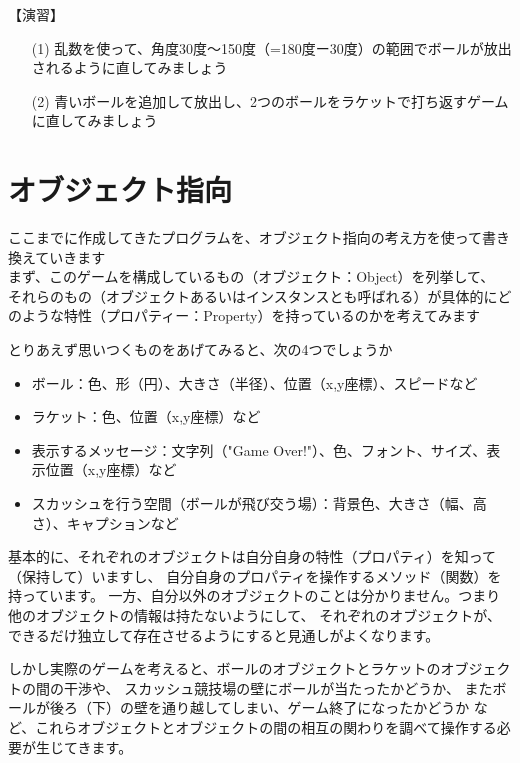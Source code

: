 \documentclass[uplatex,a4paper,11pt,oneside,openany]{jsbook}
\begin{document}
【演習】
\begin{enumerate}
  \item[(1)] 乱数を使って、角度30度〜150度（=180度ー30度）の範囲でボールが放出されるように直してみましょう
  \item[(2)] 青いボールを追加して放出し、2つのボールをラケットで打ち返すゲームに直してみましょう
\end{enumerate}

\newpage

\section{オブジェクト指向}

ここまでに作成してきたプログラムを、オブジェクト指向の考え方を使って書き換えていきます\\

まず、このゲームを構成しているもの（オブジェクト：Object）を列挙して、
それらのもの（オブジェクトあるいはインスタンスとも呼ばれる）が具体的にどのような特性（プロパティー：Property）を持っているのかを考えてみます

とりあえず思いつくものをあげてみると、次の4つでしょうか

\begin{itemize}
  \item ボール：色、形（円）、大きさ（半径）、位置（x,y座標）、スピードなど
  \item ラケット：色、位置（x,y座標）など
  \item 表示するメッセージ：文字列（"Game Over!"）、色、フォント、サイズ、表示位置（x,y座標）など
  \item スカッシュを行う空間（ボールが飛び交う場）：背景色、大きさ（幅、高さ）、キャプションなど
\end{itemize}

基本的に、それぞれのオブジェクトは自分自身の特性（プロパティ）を知って（保持して）いますし、
自分自身のプロパティを操作するメソッド（関数）を持っています。
一方、自分以外のオブジェクトのことは分かりません。つまり他のオブジェクトの情報は持たないようにして、
それぞれのオブジェクトが、できるだけ独立して存在させるようにすると見通しがよくなります。

しかし実際のゲームを考えると、ボールのオブジェクトとラケットのオブジェクトの間の干渉や、
スカッシュ競技場の壁にボールが当たったかどうか、
またボールが後ろ（下）の壁を通り越してしまい、ゲーム終了になったかどうか
など、これらオブジェクトとオブジェクトの間の相互の関わりを調べて操作する必要が生じてきます。
\end{document}
